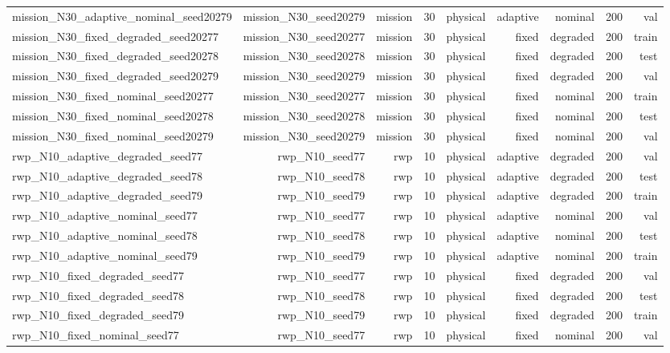 \begin{tabular}{lrrrrrrrr}
mission\_N30\_adaptive\_nominal\_seed20279 & mission\_N30\_seed20279 & mission & 30 & physical & adaptive & nominal & 200 & val \\
mission\_N30\_fixed\_degraded\_seed20277 & mission\_N30\_seed20277 & mission & 30 & physical & fixed & degraded & 200 & train \\
mission\_N30\_fixed\_degraded\_seed20278 & mission\_N30\_seed20278 & mission & 30 & physical & fixed & degraded & 200 & test \\
mission\_N30\_fixed\_degraded\_seed20279 & mission\_N30\_seed20279 & mission & 30 & physical & fixed & degraded & 200 & val \\
mission\_N30\_fixed\_nominal\_seed20277 & mission\_N30\_seed20277 & mission & 30 & physical & fixed & nominal & 200 & train \\
mission\_N30\_fixed\_nominal\_seed20278 & mission\_N30\_seed20278 & mission & 30 & physical & fixed & nominal & 200 & test \\
mission\_N30\_fixed\_nominal\_seed20279 & mission\_N30\_seed20279 & mission & 30 & physical & fixed & nominal & 200 & val \\
rwp\_N10\_adaptive\_degraded\_seed77 & rwp\_N10\_seed77 & rwp & 10 & physical & adaptive & degraded & 200 & val \\
rwp\_N10\_adaptive\_degraded\_seed78 & rwp\_N10\_seed78 & rwp & 10 & physical & adaptive & degraded & 200 & test \\
rwp\_N10\_adaptive\_degraded\_seed79 & rwp\_N10\_seed79 & rwp & 10 & physical & adaptive & degraded & 200 & train \\
rwp\_N10\_adaptive\_nominal\_seed77 & rwp\_N10\_seed77 & rwp & 10 & physical & adaptive & nominal & 200 & val \\
rwp\_N10\_adaptive\_nominal\_seed78 & rwp\_N10\_seed78 & rwp & 10 & physical & adaptive & nominal & 200 & test \\
rwp\_N10\_adaptive\_nominal\_seed79 & rwp\_N10\_seed79 & rwp & 10 & physical & adaptive & nominal & 200 & train \\
rwp\_N10\_fixed\_degraded\_seed77 & rwp\_N10\_seed77 & rwp & 10 & physical & fixed & degraded & 200 & val \\
rwp\_N10\_fixed\_degraded\_seed78 & rwp\_N10\_seed78 & rwp & 10 & physical & fixed & degraded & 200 & test \\
rwp\_N10\_fixed\_degraded\_seed79 & rwp\_N10\_seed79 & rwp & 10 & physical & fixed & degraded & 200 & train \\
rwp\_N10\_fixed\_nominal\_seed77 & rwp\_N10\_seed77 & rwp & 10 & physical & fixed & nominal & 200 & val \\

\end{tabular}
